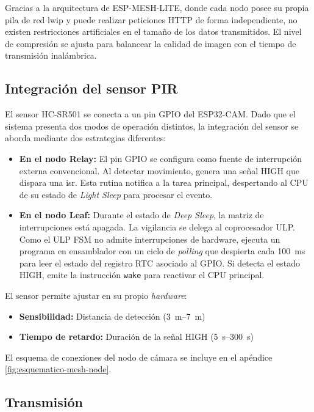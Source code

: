 \documentclass[a4paper, 12pt]{report}
\begin{document}
Gracias a la arquitectura de \gls{ESP-MESH-LITE}, donde cada nodo posee su
propia pila de red \gls{lwip} y puede realizar peticiones HTTP de forma
independiente, no existen restricciones artificiales en el tamaño de los datos
transmitidos. El nivel de compresión se ajusta para balancear la calidad de
imagen con el tiempo de transmisión inalámbrica.

\subsection{Integración del sensor PIR}

El sensor HC-SR501 se conecta a un pin GPIO del ESP32-CAM. Dado que el sistema presenta dos modos de operación distintos, la integración del sensor se aborda mediante dos estrategias diferentes:

\begin{itemize}
  \item \textbf{En el nodo Relay:} El pin GPIO se configura como fuente de interrupción externa convencional. Al detectar movimiento, genera una señal HIGH que dispara una \gls{isr}. Esta rutina notifica a la tarea principal, despertando al CPU de su estado de \textit{Light Sleep} para procesar el evento.
  \item \textbf{En el nodo Leaf:} Durante el estado de \textit{Deep Sleep}, la matriz de interrupciones está apagada. La vigilancia se delega al coprocesador ULP. Como el ULP FSM no admite interrupciones de hardware, ejecuta un programa en ensamblador con un ciclo de \textit{polling} que despierta cada \qty{100}{ms} para leer el estado del registro RTC asociado al GPIO. Si detecta el estado HIGH, emite la instrucción \texttt{wake} para reactivar el CPU principal.
\end{itemize}

El sensor permite ajustar en su propio \textit{hardware}:
\begin{itemize}
  \item \textbf{Sensibilidad:} Distancia de detección (\qtyrange{3}{7}{m})
  \item \textbf{Tiempo de retardo:} Duración de la señal HIGH (\qtyrange{5}{300}{s})
\end{itemize}

El esquema de conexiones del nodo de cámara se incluye en el apéndice
\ref{fig:esquematico-mesh-node}.

\subsection{Transmisión}
\end{document}
